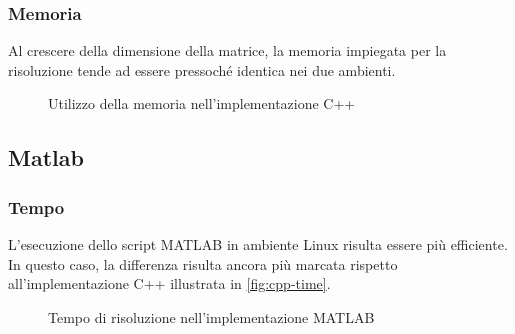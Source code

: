 \documentclass[11pt,italian]{article}
\begin{document}
\subsubsection*{Memoria}
Al crescere della dimensione della matrice, la memoria impiegata per la risoluzione tende ad essere pressoché identica nei due ambienti.
\begin{figure}[H]
    \caption{Utilizzo della memoria nell'implementazione C++}
    \label{fig:cpp-memory}
\end{figure}

\subsection{Matlab}
\subsubsection*{Tempo}
L'esecuzione dello script MATLAB in ambiente Linux risulta essere più efficiente. In questo caso, la differenza risulta ancora più marcata rispetto all'implementazione C++ illustrata in \cref{fig:cpp-time}.
\begin{figure}[H]
    \caption{Tempo di risoluzione nell'implementazione MATLAB}
    \label{fig:matlab-time}
\end{figure}
\end{document}
